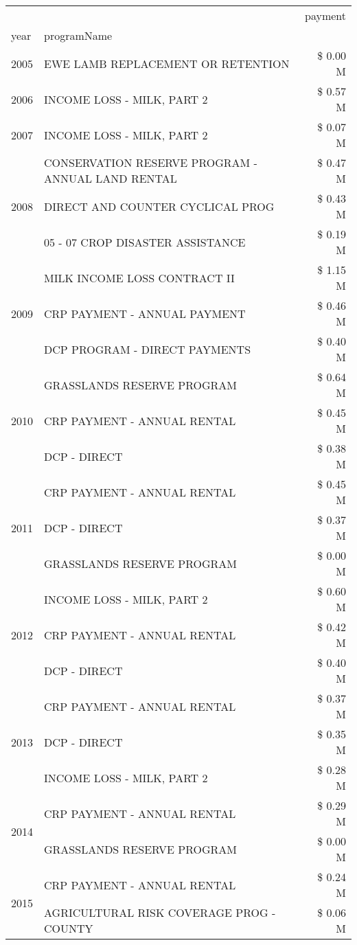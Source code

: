 \begin{tabular}{llr}
\toprule
 &  & payment \\
year & programName &  \\
\midrule
2005 & EWE LAMB REPLACEMENT OR RETENTION & \$ 0.00 M \\
\cline{1-3}
2006 & INCOME LOSS - MILK, PART 2 & \$ 0.57 M \\
\cline{1-3}
2007 & INCOME LOSS - MILK, PART 2 & \$ 0.07 M \\
\cline{1-3}
\multirow[t]{3}{*}{2008} & CONSERVATION RESERVE PROGRAM - ANNUAL LAND RENTAL & \$ 0.47 M \\
 & DIRECT AND COUNTER CYCLICAL PROG & \$ 0.43 M \\
 & 05 - 07 CROP DISASTER ASSISTANCE & \$ 0.19 M \\
\cline{1-3}
\multirow[t]{3}{*}{2009} & MILK INCOME LOSS CONTRACT II & \$ 1.15 M \\
 & CRP PAYMENT - ANNUAL PAYMENT & \$ 0.46 M \\
 & DCP PROGRAM - DIRECT PAYMENTS & \$ 0.40 M \\
\cline{1-3}
\multirow[t]{3}{*}{2010} & GRASSLANDS RESERVE PROGRAM & \$ 0.64 M \\
 & CRP PAYMENT - ANNUAL RENTAL & \$ 0.45 M \\
 & DCP - DIRECT & \$ 0.38 M \\
\cline{1-3}
\multirow[t]{3}{*}{2011} & CRP PAYMENT - ANNUAL RENTAL & \$ 0.45 M \\
 & DCP - DIRECT & \$ 0.37 M \\
 & GRASSLANDS RESERVE PROGRAM & \$ 0.00 M \\
\cline{1-3}
\multirow[t]{3}{*}{2012} & INCOME LOSS - MILK, PART 2 & \$ 0.60 M \\
 & CRP PAYMENT - ANNUAL RENTAL & \$ 0.42 M \\
 & DCP - DIRECT & \$ 0.40 M \\
\cline{1-3}
\multirow[t]{3}{*}{2013} & CRP PAYMENT - ANNUAL RENTAL & \$ 0.37 M \\
 & DCP - DIRECT & \$ 0.35 M \\
 & INCOME LOSS - MILK, PART 2 & \$ 0.28 M \\
\cline{1-3}
\multirow[t]{2}{*}{2014} & CRP PAYMENT - ANNUAL RENTAL & \$ 0.29 M \\
 & GRASSLANDS RESERVE PROGRAM & \$ 0.00 M \\
\cline{1-3}
\multirow[t]{3}{*}{2015} & CRP PAYMENT - ANNUAL RENTAL & \$ 0.24 M \\
 & AGRICULTURAL RISK COVERAGE PROG - COUNTY & \$ 0.06 M \\

\end{tabular}
